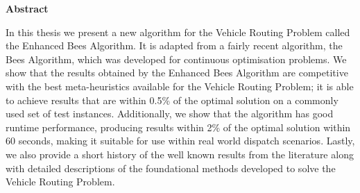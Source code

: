 \begin{center}
   \begin{minipage}{300pt}
   \begin{center}
      \textbf{Abstract}
   \end{center}
   In this thesis we present a new algorithm for the Vehicle Routing Problem called the Enhanced Bees Algorithm. It is adapted from a fairly recent algorithm, the Bees Algorithm, which was developed for continuous optimisation problems. We show that the results obtained by the Enhanced Bees Algorithm are competitive with the best meta-heuristics available for the Vehicle Routing Problem; it is able to achieve results that are within 0.5\% of the optimal solution on a commonly used set of test instances. Additionally, we show that the algorithm has good runtime performance, producing results within 2\% of the optimal solution within 60 seconds, making it suitable for use within real world dispatch scenarios. Lastly, we also provide a short history of the well known results from the literature along with detailed descriptions of the foundational methods developed to solve the Vehicle Routing Problem.
   \end{minipage}
\end{center}

\cleardoublepage
